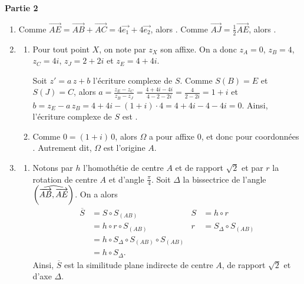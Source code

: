 \noindent
	\textbf{Partie 2}\\[-1\baselineskip]
		\begin{enumerate}
			\item {}
				Comme $\overrightarrow{AE} = \overrightarrow{AB} + \overrightarrow{AC} = 4 \vec{e_1} + 4 \vec{e_2}$,
				alors .
				Comme $\overrightarrow{AJ} = \frac{1}{2} \overrightarrow{AE}$, alors .
			\item 
				\begin{enumerate}
					\item {}
						Pour tout point $X$, on note par $z_X$ son affixe.
						On a donc $z_A = 0$, $z_B = 4$, $z_C = 4i$, $z_J = 2 + 2i$ et $z_E = 4 + 4i$.
						
						Soit $z' = a \, z + b$ l'\'ecriture complexe de $S$.
						Comme $S(B) = E$ et $S(J) = C$, alors 
						$a = \frac{z_E - z_C}{z_B - z_J} = \frac{4 + 4 i - 4i}{4 - 2 - 2i} = \frac{4}{2 - 2i} = 1 + i$
						et
						$b = z_E - a \, z_B = 4 + 4i - (1+i) \cdot 4 = 4 + 4i - 4 - 4i = 0$.
						Ainsi, l'\'ecriture complexe de $S$ est .
					\item {}
						Comme $0 = (1+i) \, 0$, alors $\Omega$ a pour affixe $0$, et donc pour coordonn\'ees .
						Autrement dit, $\Omega$ est l'origine $A$.
				\end{enumerate}
			\item 
				\begin{enumerate}
					\item {}
						Notons par $h$ l'homoth\'etie de centre $A$ et de rapport $\sqrt{2}$
							et par $r$ la rotation de centre $A$ et d'angle $\frac{\pi}{4}$.
						Soit $\Delta$ la bissectrice de l'angle $\left( \widehat{ \overrightarrow{AB} , \overrightarrow{AE} } \right)$.
						On a alors 
						\begin{align*}
							\overline{S}	& =		S \circ S_{(AB)}			&	S	& =		h \circ r							\\
											& =		h \circ r \circ S_{(AB)}	&	r	& =		S_{\Delta} \circ S_{(AB)}	\\
											& =		h \circ S_{\Delta} \circ S_{(AB)} \circ S_{(AB)}						\\
											& =		h \circ S_{\Delta}	.
						\end{align*}
							Ainsi, $\overline{S}$ est la similitude plane indirecte de centre $A$,
							de rapport $\sqrt{2}$ et d'axe $\Delta$.

\end{enumerate}
\end{enumerate}

